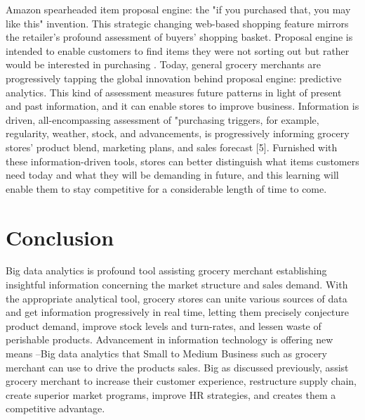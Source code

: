 \documentclass[sigconf]{acmart}
\begin{document}
Amazon spearheaded item proposal engine: the "if you purchased that, you may like this" invention. This strategic changing web-based shopping feature mirrors the retailer's profound assessment of buyers' shopping basket.  Proposal engine is intended to enable customers to find items they were not sorting out but rather would be interested in purchasing \cite{1}. Today, general grocery merchants are progressively tapping the global innovation behind proposal engine: predictive analytics. This kind of assessment measures future patterns in light of present and past information, and it can enable stores to improve business. Information is driven, all-encompassing assessment of "purchasing triggers, for example, regularity, weather, stock, and advancements, is progressively informing grocery stores' product blend, marketing plans, and sales forecast [5]. Furnished with these information-driven tools, stores can better distinguish what items customers need today and what they will be demanding in future, and this learning will enable them to stay competitive for a considerable length of time to come.  

\section{Conclusion}

Big data analytics is profound tool assisting grocery merchant establishing insightful information concerning the market structure and sales demand. With the appropriate analytical tool, grocery stores can unite various sources of data and get information progressively in real time, letting them precisely conjecture product demand, improve stock levels and turn-rates, and lessen waste of perishable products. Advancement in information technology is offering new means –Big data analytics that Small to Medium Business such as grocery merchant can use to drive the products sales. Big as discussed previously, assist grocery merchant to increase their customer experience, restructure supply chain, create superior market programs, improve HR strategies, and creates them a competitive advantage.


 
\end{document}
